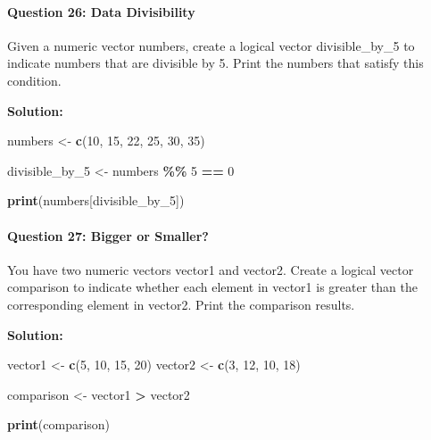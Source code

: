 \documentclass[
]{article}
\newenvironment{Shaded}{\begin{snugshade}}{\end{snugshade}}
\newcommand{\DecValTok}[1]{\textcolor[rgb]{0.00,0.00,0.81}{#1}}
\newcommand{\FunctionTok}[1]{\textcolor[rgb]{0.13,0.29,0.53}{\textbf{#1}}}
\newcommand{\NormalTok}[1]{#1}
\newcommand{\OtherTok}[1]{\textcolor[rgb]{0.56,0.35,0.01}{#1}}
\newcommand{\SpecialCharTok}[1]{\textcolor[rgb]{0.81,0.36,0.00}{\textbf{#1}}}
\begin{document}
\hypertarget{question-26-data-divisibility}{%
\paragraph{Question 26: Data
Divisibility}\label{question-26-data-divisibility}}

Given a numeric vector numbers, create a logical vector divisible\_by\_5
to indicate numbers that are divisible by 5. Print the numbers that
satisfy this condition.

\textbf{Solution:}

\begin{Shaded}
\begin{Highlighting}[]
\NormalTok{numbers }\OtherTok{\textless{}{-}} \FunctionTok{c}\NormalTok{(}\DecValTok{10}\NormalTok{, }\DecValTok{15}\NormalTok{, }\DecValTok{22}\NormalTok{, }\DecValTok{25}\NormalTok{, }\DecValTok{30}\NormalTok{, }\DecValTok{35}\NormalTok{)}

\NormalTok{divisible\_by\_5 }\OtherTok{\textless{}{-}}\NormalTok{ numbers }\SpecialCharTok{\%\%} \DecValTok{5} \SpecialCharTok{==} \DecValTok{0}

\FunctionTok{print}\NormalTok{(numbers[divisible\_by\_5])}
\end{Highlighting}
\end{Shaded}

\hypertarget{question-27-bigger-or-smaller}{%
\paragraph{Question 27: Bigger or
Smaller?}\label{question-27-bigger-or-smaller}}

You have two numeric vectors vector1 and vector2. Create a logical
vector comparison to indicate whether each element in vector1 is greater
than the corresponding element in vector2. Print the comparison results.

\textbf{Solution:}

\begin{Shaded}
\begin{Highlighting}[]
\NormalTok{vector1 }\OtherTok{\textless{}{-}} \FunctionTok{c}\NormalTok{(}\DecValTok{5}\NormalTok{, }\DecValTok{10}\NormalTok{, }\DecValTok{15}\NormalTok{, }\DecValTok{20}\NormalTok{)}
\NormalTok{vector2 }\OtherTok{\textless{}{-}} \FunctionTok{c}\NormalTok{(}\DecValTok{3}\NormalTok{, }\DecValTok{12}\NormalTok{, }\DecValTok{10}\NormalTok{, }\DecValTok{18}\NormalTok{)}

\NormalTok{comparison }\OtherTok{\textless{}{-}}\NormalTok{ vector1 }\SpecialCharTok{\textgreater{}}\NormalTok{ vector2}

\FunctionTok{print}\NormalTok{(comparison)}
\end{Highlighting}
\end{Shaded}
\end{document}
